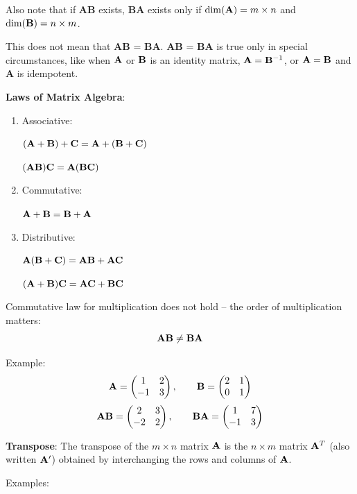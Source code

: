 \documentclass[]{book}
\theoremstyle{definition}
\theoremstyle{definition}
\theoremstyle{definition}
\theoremstyle{remark}
\begin{document}
Also note that if \textbf{AB} exists, \textbf{BA} exists only if
\(\dim({\bf A}) = m \times n\) and \(\dim({\bf B}) = n \times m\).

This does not mean that \textbf{AB} = \textbf{BA}. \textbf{AB} =
\textbf{BA} is true only in special circumstances, like when \({\bf A}\)
or \({\bf B}\) is an identity matrix, \({\bf A} = {\bf B}^{-1}\), or
\({\bf A} = {\bf B}\) and \textbf{A} is idempotent.

\textbf{Laws of Matrix Algebra}:

\begin{enumerate}
        \item \parbox[t]{1.5in}{Associative:} $\bf (A+B)+C = A+(B+C)$\\
            \parbox[t]{1.5in}{\quad}  $\bf (AB)C = A(BC)$
        \item \parbox[t]{1.5in}{Commutative:} $\bf A+B=B+A$
        \item \parbox[t]{1.5in}{Distributive:} $\bf A(B+C)=AB+AC$\\
            \parbox[t]{1.5in}{\quad}   $\bf (A+B)C=AC+BC$
\end{enumerate}

Commutative law for multiplication does not hold -- the order of
multiplication matters: \[\bf AB\ne BA\]

Example:
\[{\bf A}=\begin{pmatrix} 1&2\\-1&3\end{pmatrix}, \qquad {\bf B}=\begin{pmatrix} 2&1\\0&1\end{pmatrix}\]
\[{\bf AB}=\begin{pmatrix} 2&3\\-2&2\end{pmatrix}, \qquad {\bf BA}=\begin{pmatrix} 1&7\\-1&3\end{pmatrix}\]

\textbf{Transpose}: The transpose of the \(m\times n\) matrix \(\bf A\)
is the \(n\times m\) matrix \({\bf A}^T\) (also written \({\bf A}'\))
obtained by interchanging the rows and columns of \(\bf A\).

Examples:
\end{document}
